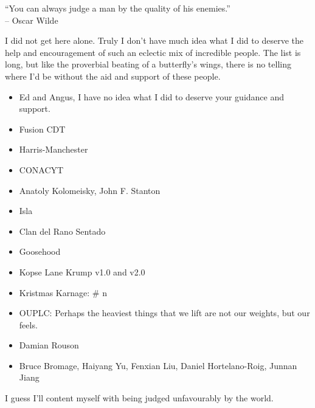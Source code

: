 \begin{frontmatter}[Acknowledgements]
    \centering
    ``You can always judge a man by the quality of his enemies.''\\
    -- Oscar Wilde

    \justify
    I did not get here alone. Truly I don't have much idea what I did to deserve the help and encouragement of such an eclectic mix of incredible people. The list is long, but like the proverbial beating of a butterfly's wings, there is no telling where I'd be without the aid and support of these people.

    \begin{itemize}
        \item Ed and Angus, I have no idea what I did to deserve your guidance and support.
        \item Fusion CDT
        \item Harris-Manchester
        \item CONACYT
        \item Anatoly Kolomeisky, John F. Stanton
        \item Isla
        \item Clan del Rano Sentado
        \item Goosehood
        \item Kopse Lane Krump v1.0 and v2.0
        \item Kristmas Karnage: \# n
        \item OUPLC: Perhaps the heaviest things that we lift are not our weights, but our feels.
        \item Damian Rouson
        \item Bruce Bromage, Haiyang Yu, Fenxian Liu, Daniel Hortelano-Roig, Junnan Jiang
    \end{itemize}

    I guess I'll content myself with being judged unfavourably by the world.
\end{frontmatter}